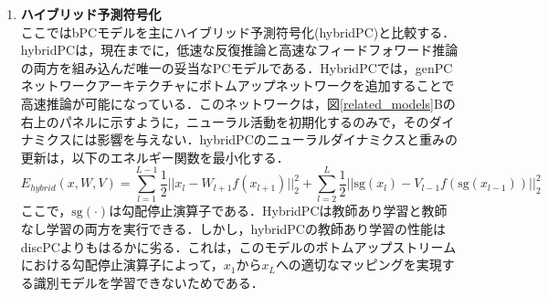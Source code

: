 \documentclass[a4paper, titlepage]{jsarticle}
\begin{document}
\begin{enumerate}
   \\
   \item \textbf{ハイブリッド予測符号化} \\
   ここではbPCモデルを主にハイブリッド予測符号化(hybridPC)と比較する．hybridPCは，現在までに，低速な反復推論と高速なフィードフォワード推論の両方を組み込んだ唯一の妥当なPCモデルである．HybridPCでは，genPCネットワークアーキテクチャにボトムアップネットワークを追加することで高速推論が可能になっている．このネットワークは，図\ref{related_models}Bの右上のパネルに示すように，ニューラル活動を初期化するのみで，そのダイナミクスには影響を与えない．hybridPCのニューラルダイナミクスと重みの更新は，以下のエネルギー関数を最小化する．
   \begin{equation}
      E_{hybrid}(x,W,V)=\sum_{l=1}^{L-1}\frac{1}{2}||x_l-W_{l+1}f(x_{l+1})||_2^2+\sum_{l=2}^L\frac{1}{2}||\mathrm{sg}(x_l)-V_{l-1}f(\mathrm{sg}(x_{l-1}))||_2^2
   \end{equation}
   ここで，$\mathrm{sg}(\cdot)$は勾配停止演算子である．HybridPCは教師あり学習と教師なし学習の両方を実行できる．しかし，hybridPCの教師あり学習の性能はdiscPCよりもはるかに劣る．これは，このモデルのボトムアップストリームにおける勾配停止演算子によって，$x_1$から$x_L$への適切なマッピングを実現する識別モデルを学習できないためである．
\end{enumerate}
\end{document}

